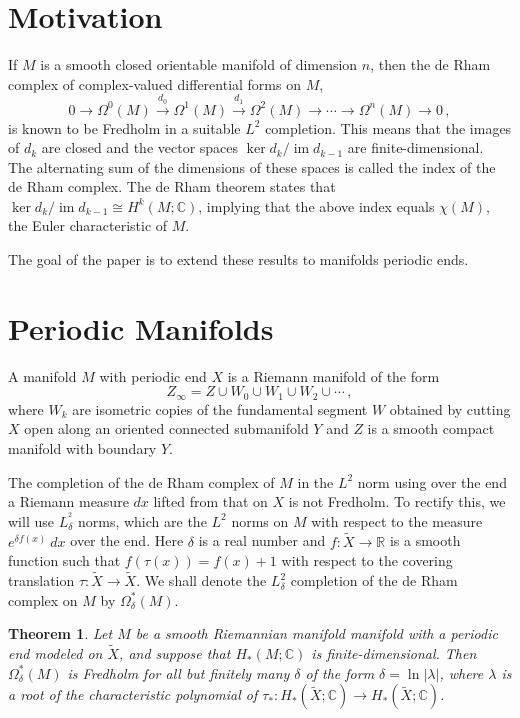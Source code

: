 \documentclass[a4paper, 12pt]{article}
\newtheorem{theorem}{Theorem}[section]
\begin{document}
\section{Motivation}

If \({ M }\) is a smooth closed orientable manifold of dimension \({ n }\), then the de Rham complex of complex-valued differential forms on \({ M }\), \[
    0 \to \Omega^{0}(M) \overset{d_0}{\to} \Omega^{1}(M) \overset{d_1}{\to} \Omega^2(M) \to \cdots \to \Omega^{n}(M) \to 0\,,
\] is known to be Fredholm in a suitable \({ L^{2} }\) completion. This means that the images of \({ d_{k} }\) are closed and the vector spaces \({ \ker d_{k} / \operatorname{im} d_{k-1} }\) are finite-dimensional. The alternating sum of the dimensions of these spaces is called the index of the de Rham complex. The de Rham theorem states that \({ \ker d_{k} / \operatorname{im} d_{k-1} \cong H^{k}(M; \mathbb C) }\), implying that the above index equals \({ \chi(M) }\), the Euler characteristic of \({ M }\).

The goal of the paper is to extend these results to manifolds periodic ends.

\section{Periodic Manifolds}

A manifold \({ M }\) with periodic end \({ X }\) is a Riemann manifold of the form \[
    Z_{\infty} = Z \cup W_0 \cup W_1 \cup W_2 \cup \cdots\,,
\] where \({ W_{k} }\) are isometric copies of the fundamental segment \({ W }\) obtained by cutting \({ X }\) open along an oriented connected submanifold \({ Y }\) and \({ Z }\) is a smooth compact manifold with boundary \({ Y }\). 

The completion of the de Rham complex of \({ M }\) in the \({ L^{2} }\) norm using over the end a Riemann measure \({ dx }\) lifted from that on \({ X }\) is not Fredholm. To rectify this, we will use \({ L_{\delta}^{^2} }\) norms, which are the \({ L^{2} }\) norms on \({ M }\) with respect to the measure \({ e^{\delta f(x)}\: dx }\) over the end. Here \({ \delta }\) is a real number and \({ f : \tilde X \to \mathbb R }\) is a smooth function such that \({ f(\tau(x)) = f(x) + 1 }\) with respect to the covering translation \({ \tau : \tilde X \to \tilde X }\). We shall denote the \({ L_{\delta}^2 }\) completion of the de Rham complex on \({ M }\) by \({ \Omega_{\delta}^*(M) }\).

\begin{theorem}
    \label{thm:Omega_delta_is_Fredholm}
    Let \({ M }\) be a smooth Riemannian manifold manifold with a periodic end modeled on \({ \tilde X }\), and suppose that \({ H_{*}(M; \mathbb C) }\) is finite-dimensional. Then \({ \Omega_{\delta}^*(M) }\) is Fredholm for all but finitely many \({ \delta }\) of the form \({ \delta = \ln \lvert \lambda \rvert }\), where \({ \lambda }\) is a root of the characteristic polynomial of \({ \tau_{*} : H_{*}(\tilde X; \mathbb C) \to H_{*}(\tilde X; \mathbb C) }\).
\end{theorem}
\end{document}

